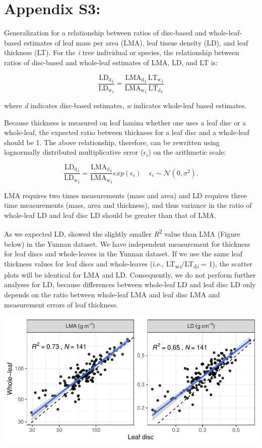 \documentclass[
  12pt,
]{article}
\author{}
\date{\vspace{-2.5em}}
\begin{document}
{
\setcounter{tocdepth}{2}
\tableofcontents
}
\hypertarget{appendix-s3}{%
\section{Appendix S3:}\label{appendix-s3}}

Generalization for a relationship between ratios of disc-based and whole-leaf-based estimates of leaf mass per area (LMA), leaf tissue density (LD), and leaf thickness (LT).
For the \emph{i} tree individual or species, the relationship between ratios of disc-based and whole-leaf estimates of LMA, LD, and LT is:

\[
\frac{\mathrm{LD_d}_i}{\mathrm{LD_w}_i} = \frac{\mathrm{LMA_d}_i}{\mathrm{LMA_w}_i} \frac{\mathrm{LT_w}_i}{\mathrm{LT_d}_i}
\]

where \emph{d} indicates disc-based estimates, \emph{w} indicates whole-leaf based estimates.

Because thickness is measured on leaf lamina whether one uses a leaf disc or a whole-leaf, the expected ratio between thickness for a leaf disc and a whole-leaf should be 1.
The above relationship, therefore, can be rewritten using lognormally distributed multiplicative error (\(\epsilon_i\)) on the arithmetic scale:

\[
\frac{\mathrm{LD_d}_i}{\mathrm{LD_w}_i} = \frac{\mathrm{LMA_d}_i}{\mathrm{LMA_w}_i} exp(\epsilon_i) \;\;\;\;\epsilon_i \sim \mathcal{N}(0, \sigma^2).
\]

LMA requires two times measurements (mass and area) and LD requires three time measurements (mass, area and thickness), and thus variance in the ratio of whole-leaf LD and leaf disc LD should be greater than that of LMA.

As we expected LD, showed the slightly smaller \emph{R}\textsuperscript{2} value than LMA (Figure below) in the Yunnan dataset.
We have independent measurement for thickness for leaf discs and whole-leaves in the Yunnan dataset.
If we use the same leaf thickness values for leaf discs and whole-leaves (i.e., LT\textsubscript{w\emph{i}}/LT\textsubscript{d\emph{i}} = 1), the scatter plots will be identical for LMA and LD.
Consequently, we do not perform further analyses for LD, because differences between whole-leaf LD and leaf disc LD only depends on the ratio between whole-leaf LMA and leaf disc LMA and measurement errors of leaf thickness.

\includegraphics[width=6.25in,height=\textheight]{../figs/lma_ld.pdf}
\end{document}
